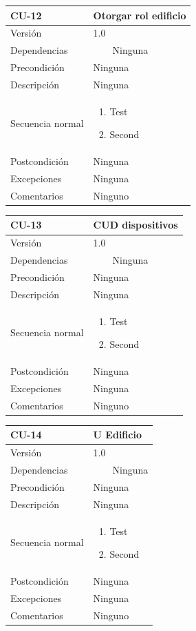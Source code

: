 \documentclass[12pt, a4paper, twoside]{article}
\newcommand{\tabitem}{~~\llap{\textbullet}~~}
\begin{document}
\begin{longtable}{ |l|l| }
  \hline
  CU-12 & Otorgar rol edificio \\ \hline
  Versión & 1.0 \\ \hline
  Dependencias & 
    \tabitem Ninguna \\ \hline
  Precondición & Ninguna \\ \hline
  Descripción & Ninguna \\ \hline
  Secuencia normal & 
  \parbox{.45\textwidth}{
    \begin{enumerate}
      \item Test
      \item Second
    \end{enumerate}
  } \\ \hline
  Postcondición & Ninguna \\ \hline
  Excepciones & Ninguna \\ \hline
  Comentarios & Ninguno \\ \hline
\end{longtable}


\begin{longtable}{ |l|l| }
  \hline
  CU-13 & CUD dispositivos \\ \hline
  Versión & 1.0 \\ \hline
  Dependencias & 
    \tabitem Ninguna \\ \hline
  Precondición & Ninguna \\ \hline
  Descripción & Ninguna \\ \hline
  Secuencia normal & 
  \parbox{.45\textwidth}{
    \begin{enumerate}
      \item Test
      \item Second
    \end{enumerate}
  } \\ \hline
  Postcondición & Ninguna \\ \hline
  Excepciones & Ninguna \\ \hline
  Comentarios & Ninguno \\ \hline
\end{longtable}

\begin{longtable}{ |l|l| }
  \hline
  CU-14 & U Edificio \\ \hline
  Versión & 1.0 \\ \hline
  Dependencias & 
    \tabitem Ninguna \\ \hline
  Precondición & Ninguna \\ \hline
  Descripción & Ninguna \\ \hline
  Secuencia normal & 
  \parbox{.45\textwidth}{
    \begin{enumerate}
      \item Test
      \item Second
    \end{enumerate}
  } \\ \hline
  Postcondición & Ninguna \\ \hline
  Excepciones & Ninguna \\ \hline
  Comentarios & Ninguno \\ \hline
\end{longtable}
\end{document}

